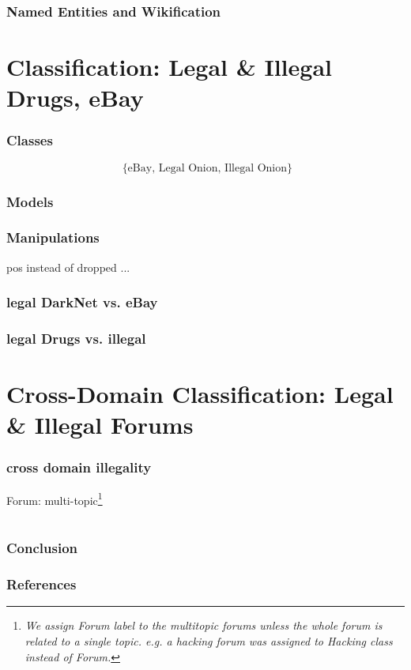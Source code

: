 \documentclass[t,xcolor={svgnames,table}]{beamer}
\begin{document}
\begin{frame}
	\frametitle{Named Entities and Wikification}
\end{frame}

\section{Classification: Legal \& Illegal Drugs, eBay}

\begin{frame}
	\frametitle{Classes}
	\[\text{ \{eBay, Legal Onion, Illegal Onion\} }\]
\end{frame}

\begin{frame}
	\frametitle{Models}
\end{frame}

\begin{frame}
	\frametitle{Manipulations}
	pos instead of
	dropped 
	...
\end{frame}

\begin{frame}
	\frametitle{legal DarkNet vs. eBay}
\end{frame}

\begin{frame}
	\frametitle{legal Drugs vs. illegal}
\end{frame}

\section{Cross-Domain Classification: Legal \& Illegal Forums}

\begin{frame}
	\frametitle{cross domain illegality}
	Forum: multi-topic\footnote{\textit{We assign Forum label to the multitopic forums unless the whole forum is related to
a single topic. e.g. a hacking forum was assigned
to Hacking class instead of Forum.}} \cite{AlNabki17}
\end{frame}

\section*{}

\begin{frame}
\frametitle{Conclusion}
\end{frame}

\begin{frame}[allowframebreaks]
\frametitle{References}

\tiny
\end{frame}
\end{document}
